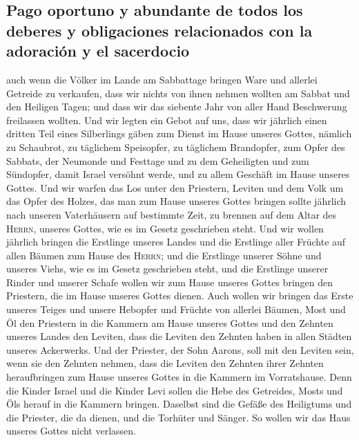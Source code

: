\hypertarget{pago-oportuno-y-abundante-de-todos-los-deberes-y-obligaciones-relacionados-con-la-adoraciuxf3n-y-el-sacerdocio}{%
\subsection{Pago oportuno y abundante de todos los deberes y
obligaciones relacionados con la adoración y el
sacerdocio}\label{pago-oportuno-y-abundante-de-todos-los-deberes-y-obligaciones-relacionados-con-la-adoraciuxf3n-y-el-sacerdocio}}

 auch wenn die Völker im Lande am Sabbattage bringen Ware
und allerlei Getreide zu verkaufen, dass wir nichts von ihnen nehmen
wollten am Sabbat und den Heiligen Tagen; und dass wir das siebente Jahr
von aller Hand Beschwerung freilassen wollten.  Und wir
legten ein Gebot auf uns, dass wir jährlich einen dritten Teil eines
Silberlings gäben zum Dienst im Hause unseres Gottes, 
nämlich zu Schaubrot, zu täglichem Speisopfer, zu täglichem Brandopfer,
zum Opfer des Sabbats, der Neumonde und Festtage und zu dem Geheiligten
und zum Sündopfer, damit Israel versöhnt werde, und zu allem Geschäft im
Hause unseres Gottes.  Und wir warfen das Los unter den
Priestern, Leviten und dem Volk um das Opfer des Holzes, das man zum
Hause unseres Gottes bringen sollte jährlich nach unseren Vaterhäusern
auf bestimmte Zeit, zu brennen auf dem Altar des \textsc{Herrn}, unseres
Gottes, wie es im Gesetz geschrieben steht.  Und wir
wollen jährlich bringen die Erstlinge unseres Landes und die Erstlinge
aller Früchte auf allen Bäumen zum Hause des \textsc{Herrn};
 und die Erstlinge unserer Söhne und unseres Viehs, wie
es im Gesetz geschrieben steht, und die Erstlinge unserer Rinder und
unserer Schafe wollen wir zum Hause unseres Gottes bringen den
Priestern, die im Hause unseres Gottes dienen.  Auch
wollen wir bringen das Erste unseres Teiges und unsere Hebopfer und
Früchte von allerlei Bäumen, Most und Öl den Priestern in die Kammern am
Hause unseres Gottes und den Zehnten unseres Landes den Leviten, dass
die Leviten den Zehnten haben in allen Städten unseres Ackerwerks.
 Und der Priester, der Sohn Aarons, soll mit den Leviten
sein, wenn sie den Zehnten nehmen, dass die Leviten den Zehnten ihrer
Zehnten heraufbringen zum Hause unseres Gottes in die Kammern im
Vorratshause.  Denn die Kinder Israel und die Kinder Levi
sollen die Hebe des Getreides, Mosts und Öls herauf in die Kammern
bringen. Daselbst sind die Gefäße des Heiligtums und die Priester, die
da dienen, und die Torhüter und Sänger. So wollen wir das Haus unseres
Gottes nicht verlassen.

